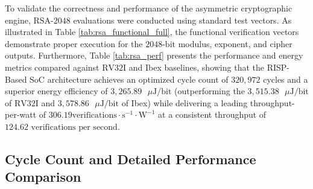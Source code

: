To validate the correctness and performance of the asymmetric cryptographic engine, $\text{RSA}\text{-}2048$ evaluations were conducted using standard test vectors. As illustrated in Table \ref{tab:rsa_functional_full}, the functional verification vectors demonstrate proper execution for the $2048\text{-bit}$ modulus, exponent, and cipher outputs. Furthermore, Table \ref{tab:rsa_perf} presents the performance and energy metrics compared against $\text{RV}32\text{I}$ and Ibex baselines, showing that the RISP-Based SoC architecture achieves an optimized cycle count of $320,972$ cycles and a superior energy efficiency of $3,265.89\text{ }\mu\text{J/bit}$ (outperforming the $3,515.38\text{ }\mu\text{J/bit}$ of $\text{RV}32\text{I}$ and $3,578.86\text{ }\mu\text{J/bit}$ of Ibex) while delivering a leading throughput-per-watt of $306.19\text{verifications} \cdot \text{s}^{-1} \cdot \text{W}^{-1}$ at a consistent throughput of $124.62\text{ verifications per second}$.


\subsection{Cycle Count and Detailed Performance Comparison}

